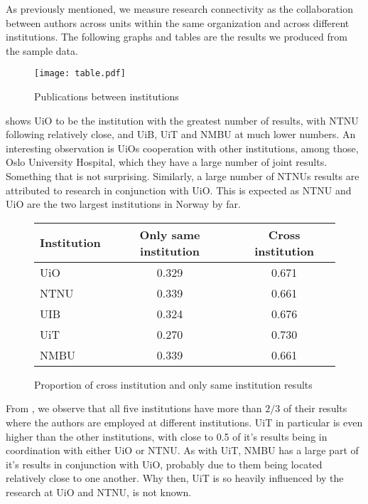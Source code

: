 As previously mentioned, we measure research connectivity as the collaboration between authors across units within the same organization and across different institutions. The following graphs and tables are the results we produced from the sample data.

\begin{figure}[h]
  \centering
  \texttt{[image: table.pdf]}
  \caption{Publications between institutions}
  \label{fig:result}
\end{figure}

 shows UiO to be the institution with the greatest number of results, with NTNU following relatively close, and UiB, UiT and NMBU at much lower numbers.
An interesting observation is UiOs cooperation with other institutions, among those, Oslo University Hospital, which they have a large number of joint results. Something that is not surprising.
Similarly, a large number of NTNUs results are attributed to research in conjunction with UiO. This is expected as NTNU and UiO are the two largest institutions in Norway by far.


\begin{figure}[h]
	\centering
	\begin{tabular}{| l || c | c |}
		\hline
		Institution	& Only same institution	& Cross institution	\\ \hline
		UiO		& 0.329			& 0.671			\\
		NTNU		& 0.339			& 0.661			\\
		UIB		& 0.324			& 0.676			\\
		UiT		& 0.270			& 0.730			\\
		NMBU		& 0.339			& 0.661			\\
		\hline
	\end{tabular}
	\caption{Proportion of cross institution and only same institution results}
	\label{tab:institution-proportion}
\end{figure}

From , we observe that all five institutions have more than $2/3$ of their results where the authors are employed at different institutions. UiT in particular is even higher than the other institutions, with close to 0.5 of it’s results being in coordination with either UiO or NTNU. As with UiT, NMBU has a large part of it’s results in conjunction with UiO, probably due to them being located relatively close to one another. Why then, UiT is so heavily influenced by the research at UiO and NTNU, is not known.

